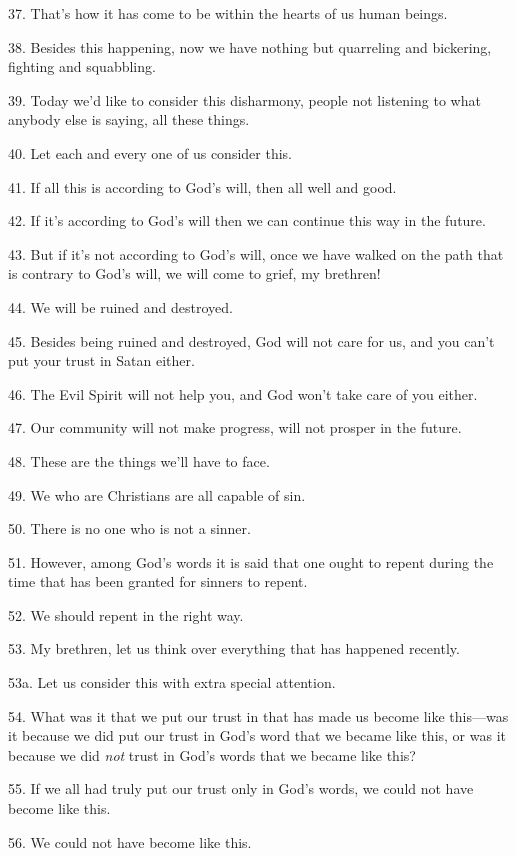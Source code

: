37. That's how it has come to be within the hearts of us human beings.

38. Besides this happening, now we have nothing but quarreling and bickering, fighting
and squabbling.

39. Today we'd like to consider this disharmony, people not listening to what anybody
else is saying, all these things.

40. Let each and every one of us consider this.

41. If all this is according to God's will, then all well and good.

42. If it's according to God's will then we can continue this way in the future.

43. But if it's not according to God's will, once we have walked on the path that
is contrary to God's will, we will come to grief, my brethren!

44. We will be ruined and destroyed.

45. Besides being ruined and destroyed, God will not care for us, and you can't
put your trust in Satan either.

46. The Evil Spirit will not help you, and God won't take care of you either.

47. Our community will not make progress, will not prosper in the future.

48. These are the things we'll have to face.

49. We who are Christians are all capable of sin.

50. There is no one who is not a sinner.

51. However, among God's words it is said that one ought to repent during the time
that has been granted for sinners to repent.

52. We should repent in the right way.

53. My brethren, let us think over everything that has happened recently.

53a. Let us consider this with extra special attention.

54. What was it that we put our trust in that has made us become like this---was
it because we did put our trust in God's word that we became like this, or was
it because we did \textit{not} trust in God's words that we became like this?

55. If we all had truly put our trust only in God's words, we could not have become
like this.

56. We could not have become like this.


